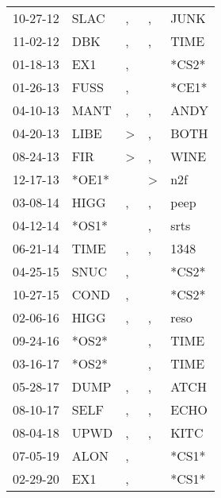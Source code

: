 \begin{supertabular}{lllll}
 10-27-12 &   SLAC &             , &             , &   JUNK \\
 11-02-12 &    DBK &             , &             , &   TIME \\
 01-18-13 &    EX1 &             , &               &  *CS2* \\
 01-26-13 &   FUSS &             , &               &  *CE1* \\
 04-10-13 &   MANT &             , &             , &   ANDY \\
 04-20-13 &   LIBE &  \textgreater &             , &   BOTH \\
 08-24-13 &    FIR &  \textgreater &             , &   WINE \\
 12-17-13 &  *OE1* &               &  \textgreater &    n2f \\
 03-08-14 &   HIGG &             , &             , &   peep \\
 04-12-14 &  *OS1* &               &             , &   srts \\
 06-21-14 &   TIME &             , &             , &   1348 \\
 04-25-15 &   SNUC &             , &               &  *CS2* \\
 10-27-15 &   COND &             , &               &  *CS2* \\
 02-06-16 &   HIGG &             , &             , &   reso \\
 09-24-16 &  *OS2* &               &             , &   TIME \\
 03-16-17 &  *OS2* &               &             , &   TIME \\
 05-28-17 &   DUMP &             , &             , &   ATCH \\
 08-10-17 &   SELF &             , &             , &   ECHO \\
 08-04-18 &   UPWD &             , &             , &   KITC \\
 07-05-19 &   ALON &             , &               &  *CS1* \\
 02-29-20 &    EX1 &             , &               &  *CS1* \\
\end{supertabular}
